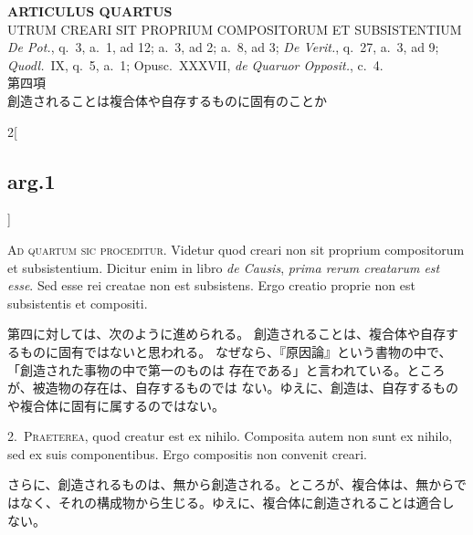 \documentclass[paper=a4paper,fontsize=10pt,jafontsize=9pt,titlepage]{jlreq}
\begin{document}

\begin{center}
 {\Large {\bfseries ARTICULUS QUARTUS}}\\
 {\large UTRUM CREARI SIT PROPRIUM COMPOSITORUM ET SUBSISTENTIUM}\\
 {\footnotesize {\itshape De Pot.}, q.~3, a.~1, ad 12; a.~3, ad 2; a.~8,
 ad 3; {\itshape De Verit.}, q.~27, a.~3, ad 9; {\itshape Quodl.}~IX,
 q.~5, a.~1; Opusc.~XXXVII, {\itshape de Quaruor Opposit.}, c.~4.}\\
 {\Large 第四項\\創造されることは複合体や自存するものに固有のことか}
\end{center}

\begin{paracol}{2}[\subsection{arg.1}]

{\huge A}{\scshape d quartum sic proceditur}. Videtur quod creari non
sit proprium compositorum et subsistentium. Dicitur enim in libro
{\itshape de Causis}, {\itshape prima rerum creatarum est esse}. Sed
esse rei creatae non est subsistens. Ergo creatio proprie non est
subsistentis et compositi.

\switchcolumn

第四に対しては、次のように進められる。
創造されることは、複合体や自存するものに固有ではないと思われる。
なぜなら、『原因論』という書物の中で、「創造された事物の中で第一のものは
 存在である」と言われている。ところが、被造物の存在は、自存するものでは
 ない。ゆえに、創造は、自存するものや複合体に固有に属するのではない。


2.~{\scshape Praeterea}, quod creatur est ex
nihilo. Composita autem non sunt ex nihilo, sed ex suis
componentibus. Ergo compositis non convenit creari.

\switchcolumn

さらに、創造されるものは、無から創造される。ところが、複合体は、無からで
 はなく、それの構成物から生じる。ゆえに、複合体に創造されることは適合し
 ない。



\end{paracol}
\end{document}
